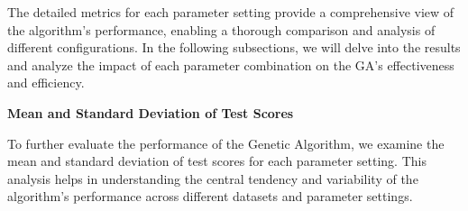 \documentclass{article}
\begin{document}
    The detailed metrics for each parameter setting provide a comprehensive view of the algorithm's performance, enabling a thorough comparison and analysis of different configurations. In the following subsections, we will delve into the results and analyze the impact of each parameter combination on the GA's effectiveness and efficiency.

    \textbf{Mean and Standard Deviation of Test Scores}

    To further evaluate the performance of the Genetic Algorithm, we examine the mean and standard deviation of test scores for each parameter setting. This analysis helps in understanding the central tendency and variability of the algorithm's performance across different datasets and parameter settings.

    \begin{table}[H]
        \centering
\end{table}
\end{document}
